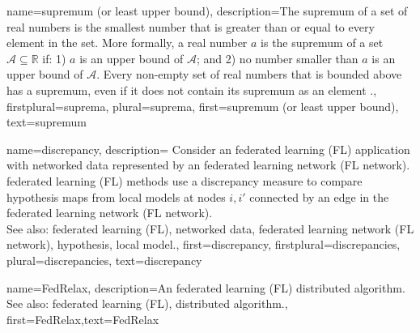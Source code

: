 {name={supremum (or least upper bound)},
  description={The supremum of a set of real numbers is 
   the smallest number that is greater than or equal to every element in the set. More formally, a 
   real number $a$ is the supremum of a set $\mathcal{A} \subseteq \mathbb{R}$ if: 1) $a$ 
   is an upper bound of $\mathcal{A}$; and 2) no number smaller than $a$ is an upper bound of $\mathcal{A}$. 
   Every non-empty set of real numbers that is bounded above has a supremum, even if it does 
  not contain its supremum as an element \cite[Sec.~1.4]{RudinBookPrinciplesMatheAnalysis}.},
  firstplural={suprema}, 
  plural={suprema}, 
   first={supremum (or least upper bound)},
   text={supremum}
}

{name={discrepancy},
	description={
		Consider an federated learning (FL) application with networked data 
		represented by an federated learning network (FL network). federated learning (FL) methods use a discrepancy measure 
		to compare hypothesis maps from local models at nodes $i,i'$ 
		connected by an edge in the federated learning network (FL network).
					\\ 
		See also: federated learning (FL), networked data, federated learning network (FL network), hypothesis, local model.},
  first={discrepancy},
  firstplural={discrepancies}, 
  plural={discrepancies}, 
  text={discrepancy}
}

{name={FedRelax},
	description={An federated learning (FL) distributed algorithm. 
		\\ 
		See also: federated learning (FL), distributed algorithm.},
	first={FedRelax},text={FedRelax}
} 

